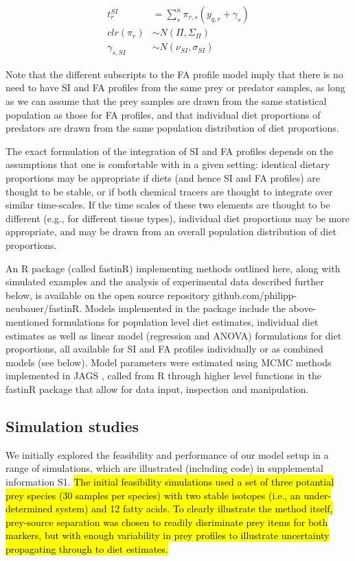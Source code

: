 \documentclass[fleqn,10pt]{wlpeerj}
\begin{document}
\begin{align}
\label{eq:4}
t_{r}^{SI} &=  \sum_{s}^n  \pi_{r,s}  \left(y_{q,r} + \gamma_{s} \right) \\
clr(\pi_{r}) &\sim N(\Pi,\Sigma_{\Pi})\\
\gamma_{s,SI} &\sim N(\nu_{SI},\sigma_{SI})
\end{align}


Note that the different subscripts to the FA profile model imply that there is no need to have SI and
FA profiles from the same prey or predator samples, as long as we can assume that the prey samples are drawn
from the same statistical population as those for FA profiles, and that individual diet proportions of
predators are drawn from the same population distribution of diet
proportions.

The exact formulation of the integration of SI and FA profiles depends on the
assumptions that one is comfortable with in a given setting: identical
dietary proportions may be appropriate if diets (and hence SI and FA profiles)
are thought to be stable, or if both chemical tracers are thought to
integrate over similar time-scales. If the time scales of these two
elements are thought to be different (e.g., for different tissue
types), individual diet proportions may be more
appropriate, and may be drawn from an overall population distribution
of diet proportions. 


An R \citep{R_core_2014}
package (called fastinR) implementing methods outlined here, along with simulated
examples and the analysis of
experimental data described further below, is available on the
open source repository github.com/philipp-neubauer/fastinR. Models
implemented in the package include the above-mentioned formulations
for population level diet estimates, individual diet
estimates  as well as linear model
(regression and ANOVA) formulations for diet proportions, all
available for SI and FA profiles individually or as combined models (see
below). Model parameters were estimated using MCMC methods
implemented in JAGS \citep{plummer_jags_2003}, called
from R through higher level functions in the
fastinR package that allow for data input,
 inspection and manipulation.

\subsection*{Simulation studies}

We initially explored the feasibility and performance of our model setup in a
range of simulations, which are illustrated (including code) in supplemental information S1. \hl{The initial feasibility simulations used a set of three potantial prey species (30 samples per species) with two stable isotopes (i.e., an under-determined system) and 12 fatty acids. To clearly illustrate the method itself, prey-source separation was chosen to readily disriminate prey items for both markers, but with enough variability in prey profiles to illustrate uncertainty propagating through to diet estimates.} 
\end{document}
